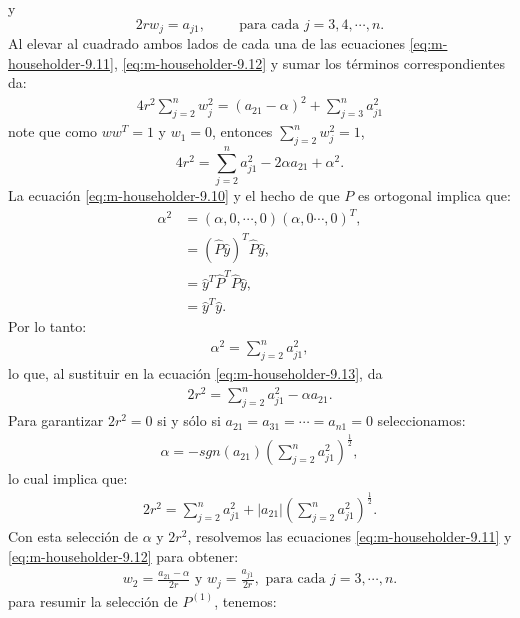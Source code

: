 y
\begin{equation}\label{eq:m-householder-9.12}
  2rw_j=a_{j1},\hspace{1cm}\text{para cada }j=3,4,\cdots,n.
\end{equation}
Al elevar al cuadrado ambos lados de cada una de las ecuaciones \ref{eq:m-householder-9.11}, \ref{eq:m-householder-9.12} y sumar los términos correspondientes da:
\begin{align*}
  4r^2\sum_{j=2}^{n}w_j^2=(a_{21}-\alpha)^{2}+\sum_{j=3}^{n}a_{j1}^{2}
\end{align*}
note que como $ww^{T}=1$ y $w_1=0$, entonces $\sum_{j=2}^{n}w_{j}^{2}=1$,
\begin{equation}\label{eq:m-householder-9.13}
  4r^{2}=\sum_{j=2}^{n}a_{j1}^{2}-2\alpha a_{21}+\alpha^2.
\end{equation}
La ecuación \ref{eq:m-householder-9.10} y el hecho de que $P$ es ortogonal implica que:
\begin{align*}
  \alpha^2&=(\alpha,0,\cdots,0)(\alpha,0\cdots,0)^{T},\\
  &=(\hat{P}\hat{y})^{T}\hat{P}\hat{y},\\
  &=\hat{y}^{T}\hat{P}^{T}\hat{P}\hat{y},\\
  &=\hat{y}^T\hat{y}.
\end{align*}
Por lo tanto:
\begin{align*}
  \alpha^{2}=\sum_{j=2}^{n}a_{j1}^{2},
\end{align*}
lo que, al sustituir en la ecuación \ref{eq:m-householder-9.13}, da
\begin{align*}
  2r^{2}=\sum_{j=2}^{n}a_{j1}^2-\alpha a_{21}.
\end{align*}
Para garantizar $2r^2=0$ si y sólo si $a_{21}=a_{31}=\cdots=a_{n1}=0$ seleccionamos:
\begin{align*}
  \alpha=-sgn(a_{21})\left( \sum_{j=2}^{n}a_{j1}^{2} \right)^{\frac{1}{2}},
\end{align*}
lo cual implica que:
\begin{align*}
  2r^{2}=\sum_{j=2}^{n}a_{j1}^{2}+|a_{21}|\left( \sum_{j=2}^{n}a_{j1}^{2} \right)^{\frac{1}{2}}.
\end{align*}
Con esta selección de $\alpha$ y $2r^2$, resolvemos las ecuaciones \ref{eq:m-householder-9.11} y \ref{eq:m-householder-9.12} para obtener:
\begin{align*}
  w_{2}=\frac{a_{21}-\alpha}{2r}\text{ y }w_{j}=\frac{a_{j1}}{2r},\text{ para cada }j=3,\cdots,n.
\end{align*}
para resumir la selección de $P^{(1)}$, tenemos:
